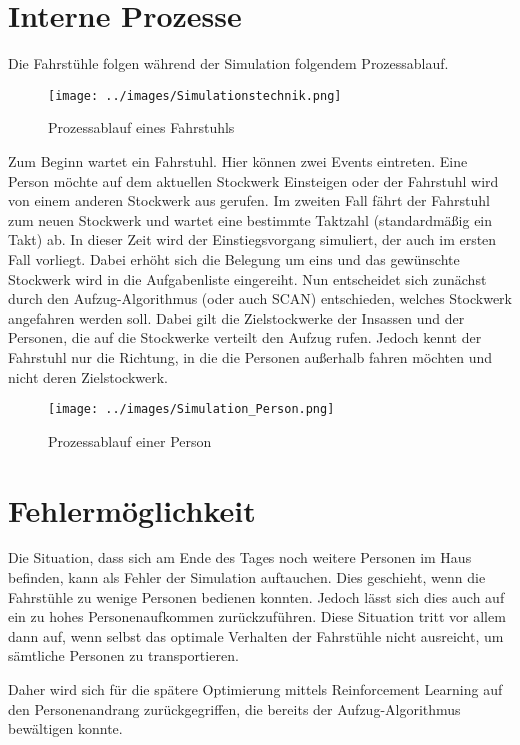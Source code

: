 \documentclass[envcountsame, envcountchap, deutsch]{i-studis}
\begin{document}
\hypertarget{interne-prozesse}{%
\section{Interne Prozesse}\label{interne-prozesse}}

Die Fahrstühle folgen während der Simulation folgendem Prozessablauf.

\begin{figure}
\centering
\texttt{[image: ../images/Simulationstechnik.png]}
\caption{Prozessablauf eines Fahrstuhls}
\end{figure}

Zum Beginn wartet ein Fahrstuhl. Hier können zwei Events eintreten. Eine
Person möchte auf dem aktuellen Stockwerk Einsteigen oder der Fahrstuhl
wird von einem anderen Stockwerk aus gerufen. Im zweiten Fall fährt der
Fahrstuhl zum neuen Stockwerk und wartet eine bestimmte Taktzahl
(standardmäßig ein Takt) ab. In dieser Zeit wird der Einstiegsvorgang
simuliert, der auch im ersten Fall vorliegt. Dabei erhöht sich die
Belegung um eins und das gewünschte Stockwerk wird in die Aufgabenliste
eingereiht. Nun entscheidet sich zunächst durch den Aufzug-Algorithmus
(oder auch SCAN) entschieden, welches Stockwerk angefahren werden soll.
Dabei gilt die Zielstockwerke der Insassen und der Personen, die auf die
Stockwerke verteilt den Aufzug rufen. Jedoch kennt der Fahrstuhl nur die
Richtung, in die die Personen außerhalb fahren möchten und nicht deren
Zielstockwerk.

\begin{figure}
\centering
\texttt{[image: ../images/Simulation\_Person.png]}
\caption{Prozessablauf einer Person}
\end{figure}

\hypertarget{fehlermuxf6glichkeit}{%
\section{Fehlermöglichkeit}\label{fehlermuxf6glichkeit}}

Die Situation, dass sich am Ende des Tages noch weitere Personen im Haus
befinden, kann als Fehler der Simulation auftauchen. Dies geschieht,
wenn die Fahrstühle zu wenige Personen bedienen konnten. Jedoch lässt
sich dies auch auf ein zu hohes Personenaufkommen zurückzuführen. Diese
Situation tritt vor allem dann auf, wenn selbst das optimale Verhalten
der Fahrstühle nicht ausreicht, um sämtliche Personen zu transportieren.

Daher wird sich für die spätere Optimierung mittels Reinforcement
Learning auf den Personenandrang zurückgegriffen, die bereits der
Aufzug-Algorithmus bewältigen konnte.
\end{document}
